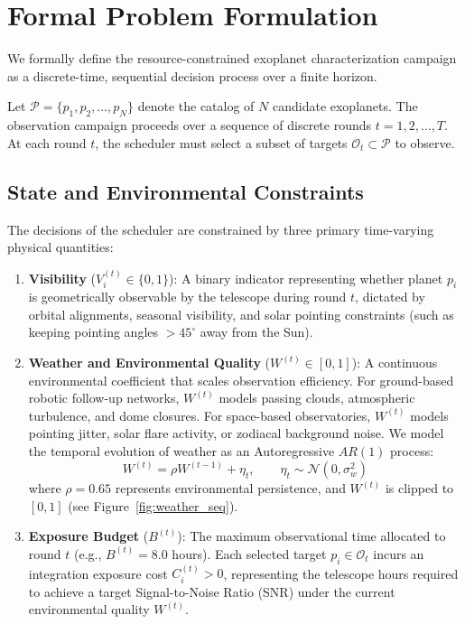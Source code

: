 \documentclass[11pt,a4paper]{article}
\begin{document}
\section{Formal Problem Formulation}
\label{sec:problem}

We formally define the resource-constrained exoplanet characterization campaign as a discrete-time, sequential decision process over a finite horizon.

Let $\mathcal{P} = \{p_1, p_2, \ldots, p_N\}$ denote the catalog of $N$ candidate exoplanets. The observation campaign proceeds over a sequence of discrete rounds $t = 1, 2, \ldots, T$. At each round $t$, the scheduler must select a subset of targets $\mathcal{O}_t \subset \mathcal{P}$ to observe.

\subsection{State and Environmental Constraints}

The decisions of the scheduler are constrained by three primary time-varying physical quantities:
\begin{enumerate}
    \item \textbf{Visibility} ($V_i^{(t)} \in \{0, 1\}$): A binary indicator representing whether planet $p_i$ is geometrically observable by the telescope during round $t$, dictated by orbital alignments, seasonal visibility, and solar pointing constraints (such as keeping pointing angles $> 45^\circ$ away from the Sun).
    \item \textbf{Weather and Environmental Quality} ($W^{(t)} \in [0, 1]$): A continuous environmental coefficient that scales observation efficiency. For ground-based robotic follow-up networks, $W^{(t)}$ models passing clouds, atmospheric turbulence, and dome closures. For space-based observatories, $W^{(t)}$ models pointing jitter, solar flare activity, or zodiacal background noise. We model the temporal evolution of weather as an Autoregressive $AR(1)$ process:
    \begin{equation}
    W^{(t)} = \rho W^{(t-1)} + \eta_t, \qquad \eta_t \sim \mathcal{N}(0, \sigma_w^2)
    \label{eq:weather}
    \end{equation}
    where $\rho = 0.65$ represents environmental persistence, and $W^{(t)}$ is clipped to $[0,1]$ (see Figure~\ref{fig:weather_seq}).
    \item \textbf{Exposure Budget} ($B^{(t)}$): The maximum observational time allocated to round $t$ (e.g., $B^{(t)} = 8.0$ hours). Each selected target $p_i \in \mathcal{O}_t$ incurs an integration exposure cost $C_i^{(t)} > 0$, representing the telescope hours required to achieve a target Signal-to-Noise Ratio (SNR) under the current environmental quality $W^{(t)}$.
\end{enumerate}
\end{document}
